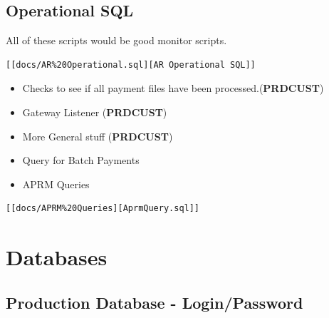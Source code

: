 \documentclass[12pt,twoside]{article}
\begin{document}
\subsection{Operational SQL}
\label{sec:orgheadline67}
All of these scripts would be good monitor scripts.
\begin{verbatim}
[[docs/AR%20Operational.sql][AR Operational SQL]]
\end{verbatim}

\begin{itemize}
\item Checks to see if all payment files have been
processed.(\textbf{PRDCUST})
\item Gateway Listener (\textbf{PRDCUST})
\item More General stuff (\textbf{PRDCUST})
\item Query for Batch Payments
\end{itemize}
\begin{itemize}
\item APRM Queries
\end{itemize}
\begin{verbatim}
[[docs/APRM%20Queries][AprmQuery.sql]]
\end{verbatim}
\newpage
\section{Databases}
\label{sec:orgheadline162}
\subsection{Production Database - Login/Password}
\label{sec:orgheadline69}
\footnotesize
\end{document}
